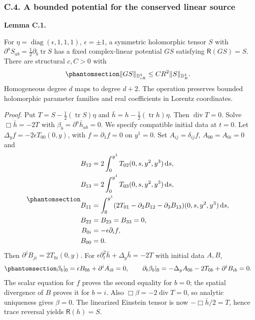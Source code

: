\documentclass[
  english,
  11pt,
  reqno]{amsart}
\makeatletter
\newcommand{\pandocstatementheading}[1]{%
  \par\addpenalty{\@beginparpenalty}%
  \addvspace{.5\baselineskip plus .2\baselineskip minus .2\baselineskip}%
  {\normalfont\bfseries #1\par}%
  \nobreak\@afterindenttrue\@afterheading
}
\makeatother
\begin{document}
\protect{}\label{sec:gg-conserved-linear-potential}

\subsubsection{C.4. A bounded potential for the conserved linear
source}\label{c.4.-a-bounded-potential-for-the-conserved-linear-source}

\pandocstatementheading{\protect{}\label{lem:gg-conserved-linear-ricci-potential}Lemma C.1.}

For \(\eta=\operatorname{diag}(\epsilon,1,1,1)\), \(\epsilon=\pm1\), a
symmetric holomorphic tensor \(S\) with
\(\partial^aS_{ab}=\frac12\partial_b\operatorname{tr}S\) has a fixed
complex-linear potential \(G S\) satisfying \(\mathsf R(GS)=S\). There
are structural \(c,C>0\) with
\begin{equation}\protect\phantomsection\label{eq:gg-conserved-linear-potential-bound}{
 \|GS\|_{\mathbb D_{cR}^4}\le CR^2\|S\|_{\mathbb D_R^4}.
}\end{equation} Homogeneous degree \(d\) maps to degree \(d+2\). The
operation preserves bounded holomorphic parameter families and real
coefficients in Lorentz coordinates.

\emph{Proof.} Put \(T=S-\frac12(\operatorname{tr}S)\eta\) and
\(\bar h=h-\frac12(\operatorname{tr}h)\eta\). Then
\(\operatorname{div}T=0\). Solve \(\Box\bar h=-2T\) with
\(\beta_b=\partial^a\bar h_{ab}=0\). We specify compatible initial data
at \(t=0\). Let \(\Delta_yf=-2\epsilon T_{00}(0,y)\), with
\(f=\partial_1f=0\) on \(y^1=0\). Set \(A_{ij}=\delta_{ij}f\),
\(A_{00}=A_{0i}=0\) and
\begin{equation}\protect\phantomsection\label{eq:gg-linear-source-compatible-data}{\begin{aligned}
B_{12}&=2\int_0^{y^1}T_{02}(0,s,y^2,y^3)\,\mathrm ds, \\
B_{13}&=2\int_0^{y^1}T_{03}(0,s,y^2,y^3)\,\mathrm ds, \\
B_{11}&=\int_0^{y^1}
       (2T_{01}-\partial_2B_{12}-\partial_3B_{13})
                        (0,s,y^2,y^3)\,\mathrm ds, \\
B_{22}&=B_{23}=B_{33}=0, \\
B_{0i}&=-\epsilon\partial_if, \\
B_{00}&=0 .
\end{aligned}}\end{equation} Then \(\partial^jB_{ji}=2T_{0i}(0,y)\). For
\(\epsilon\partial_t^2\bar h+\Delta_y\bar h=-2T\) with initial data
\(A,B\),
\begin{equation}\protect\phantomsection\label{eq:gg-linear-source-gauge-data}{
 \beta_b|_0=\epsilon B_{0b}+\partial^iA_{ib}=0,\qquad
 \partial_t\beta_b|_0
       =-\Delta_yA_{0b}-2T_{0b}+\partial^iB_{ib}=0 .
}\end{equation} The scalar equation for \(f\) proves the second equality
for \(b=0\); the spatial divergence of \(B\) proves it for \(b=i\). Also
\(\Box\beta=-2\operatorname{div}T=0\), so analytic uniqueness gives
\(\beta=0\). The linearized Einstein tensor is now \(-\Box\bar h/2=T\),
hence trace reversal yields \(\mathsf R(h)=S\).
\end{document}
